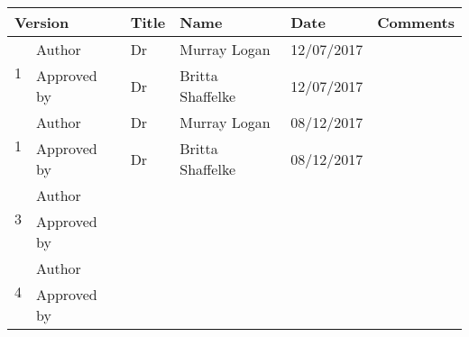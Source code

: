 \begin{tabular}{|l|l|l|p{4cm}|p{4cm}|p{3cm}|}
\hline
\multicolumn{2}{|l|}{Version} & Title & Name & Date & Comments\\
\hline
\multirow{2}{*}{1} & Author &Dr&Murray Logan&12/07/2017&\\
\cline{2-6}
 & Approved by & Dr&Britta Shaffelke&12/07/2017&\\
  \hline
\multirow{2}{*}{1} & Author &Dr&Murray Logan&08/12/2017&\\
\cline{2-6}
 & Approved by &Dr&Britta Shaffelke&08/12/2017&\\
\hline  
\multirow{2}{*}{3} & Author &&&&\\
\cline{2-6}
 & Approved by & &&&\\
\hline
\multirow{2}{*}{4} & Author &&&&\\
\cline{2-6}
 & Approved by & &&&\\
\hline

\end{tabular}

\newpage

\tableofcontents
\newpage
\listoffigures
\newpage
\listoftables
\newpage
